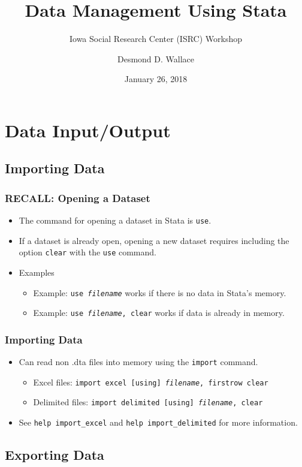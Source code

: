 \documentclass{beamer}
\title[Data Management Using Stata]{Data Management Using Stata}
\subtitle[ISRC Workshop]{Iowa Social Research Center (ISRC) Workshop}
\author[Wallace]{Desmond D. Wallace}
\institute[University of Iowa]{Department of Political Science\\The University of Iowa\\Iowa City, IA}
\date{January 26, 2018}
\begin{document}
	
\begin{frame}
	\titlepage
\end{frame}

\section{Data Input/Output}

\subsection{Importing Data}

\begin{frame}
	\frametitle{RECALL: Opening a Dataset}
		\begin{itemize}
			\item The command for opening a dataset in Stata is \texttt{use}.
			\item If a dataset is already open, opening a new dataset requires including the option \texttt{clear} with the \texttt{use} command.
			\item Examples
				\begin{itemize}
					\item Example: \texttt{use \textit{filename}} works if there is no data in Stata's memory.
					\item Example: \texttt{use \textit{filename}, clear} works if data is already in memory.
				\end{itemize}
		\end{itemize}
\end{frame}

\begin{frame}
	\frametitle{Importing Data}
		\begin{itemize}
			\item Can read non .dta files into memory using the \texttt{import} command.
				\begin{itemize}
					\item Excel files: \texttt{import excel [using] \textit{filename}, firstrow clear}
					\item Delimited files: \texttt{import delimited [using] \textit{filename}, clear}
				\end{itemize}
			\item See \texttt{help import\_{excel}} and \texttt{help import\_{delimited}} for more information.
		\end{itemize}
\end{frame}

\subsection{Exporting Data}
\end{document}
